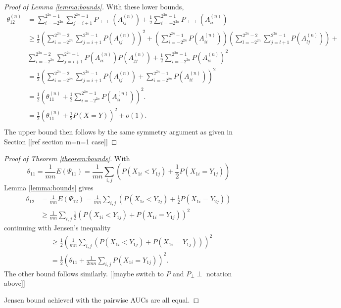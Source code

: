 \message{ !name(manuscript.tex)}\documentclass[12pt]{article}
\DeclareMathOperator{\AUC}{AUC}
\newcommand{\E}{E}
\renewcommand{\P}{P}
\newcommand{\cind}{\perp \!\!\! \perp}
\newcommand{\aucindiv}{\theta_{11}}%
\newcommand{\aucpop}{\theta_{12}}%
\newcommand{\Kernel}{\Psi}
\newcommand{\Pind}{P_{\cind}}
\newcommand{\A}[1]{P(A^{(n)}_{#1})}
\begin{document}
\begin{proof}[Proof of Lemma \ref{lemma:bounds}]


    With these lower bounds,
    \begin{align}
    \aucpop^{(n)} &= \sum_{i=-2^{2n}}^{2^{2n}-1}\sum_{j=i+1}^{2^{2n}-1} \Pind(A_{ij}^{(n)})
                    + \frac{1}{2}\sum_{i=-2^{2n}}^{2^{2n}-1} \Pind(A_{ii}^{(n)})\\
                  &\ge \frac{1}{2}\left(\sum_{i=-2^{2n}}^{2^{2n}-2}\sum_{j=i+1}^{2^{2n}-1}\A{ij}\right)^2 +
                    \left(\sum_{i=-2^{2n}}^{2^{2n}-1}\A{ii}\right)
                    \left(\sum_{l=-2^{2n}}^{2^{2n}-2}\sum_{j=l+1}^{2^{2n}-1}\A{lj}\right) +\\
                  &\sum_{i=-2^{2n}}^{2^{2n}-2}\sum_{j=i+1}^{2^{2n}-1} \A{ii}\A{jj}
                    + \frac{1}{2}\sum_{i=-2^{2n}}^{2^{2n}-1} \P(A_{ii}^{(n)})^2\\
                  &= \frac{1}{2}\left(\sum_{i=-2^{2n}}^{2^{2n}-2}\sum_{j=i+1}^{2^{2n}-1}\A{ij} +
                    \sum_{i=-2^{2n}}^{2^{2n}-1} \P(A_{ii}^{(n)})\right)^2\\
      &= \frac{1}{2}\left(\aucindiv^{(n)} +\frac{1}{2}\sum_{i=-2^{2n}}^{2^{2n}-1} \P(A_{ii}^{(n)})\right)^2.\\
      &= \frac{1}{2}\left(\aucindiv^{(n)} +\frac{1}{2}\P(X=Y)\right)^2+o(1).\\
    \end{align}
     The upper bound then follows by the same symmetry argument as given in Section [[ref section m=n=1 case]]
    
  \end{proof}

\begin{proof}[Proof of Theorem \ref{theorem:bounds}]

  With
  $$
  \aucindiv = \frac{1}{mn}\E(\Kernel_{11}) = \frac{1}{mn}\sum_{i,j}(\P(X_{1i}<Y_{1j})+\frac{1}{2}\P(X_{1i}=Y_{1j}))
  $$
  Lemma \ref{lemma:bounds} gives
  \begin{align}
    \aucpop &= \frac{1}{mn}\E(\Kernel_{12}) = \frac{1}{mn}\sum_{i,j}(P(X_{1i}<Y_{2j})+\frac{1}{2}\P(X_{1i}=Y_{2j}))\\
    &\ge \frac{1}{mn}\sum_{i,j}\frac{1}{2}(\P(X_{1i}<Y_{1j})+\P(X_{1i}=Y_{1j}))^2
  \end{align}
  continuing with Jensen's inequality
  \begin{align}
    &\ge \frac{1}{2}\left(\frac{1}{mn}\sum_{i,j}(\P(X_{1i}<Y_{1j})+\P(X_{1i}=Y_{1j}))\right)^2\\
    &= \frac{1}{2}\left(\aucindiv + \frac{1}{2mn}\sum_{i,j}\P(X_{1i}=Y_{1j})\right)^2.
  \end{align}
  The other bound follows similarly.
  [[maybe switch to $P$ and $\P_\cind$ notation above]]


  Jensen bound achieved with the pairwise AUCs are all equal.
\end{proof}
\end{document}
